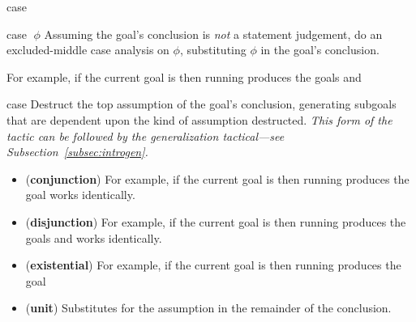 \begin{tactic}{case}
  \begin{tsyntax}{case $\;\phi$}
    Assuming the goal's conclusion is \emph{not} a statement
    judgement, do an excluded-middle case analysis on $\phi$,
    substituting $\phi$ in the goal's conclusion.

    For example, if the current goal is
     then
    running 
    produces the goals
    and
  \end{tsyntax}

  \begin{tsyntax}{case}
    Destruct the top assumption of the goal's conclusion, generating
    subgoals that are dependent upon the kind of assumption
    destructed. \emph{This form of the tactic can be followed by
    the generalization tactical---see Subsection~\ref{subsec:introgen}.}

    \begin{itemize}
    \item (\textbf{conjunction})
    For example, if the current goal is
     then
    running 
    produces the goal
    \ec{&&} works identically.

    \item (\textbf{disjunction})
    For example, if the current goal is
     then
    running 
    produces the goals
    and
    \ec{||} works identically.

    \item (\textbf{existential})
    For example, if the current goal is
     then
    running 
    produces the goal

    \item (\textbf{unit}) Substitutes  for the assumption in
      the remainder of the conclusion.


\end{itemize}
\end{tsyntax}
\end{tactic}
